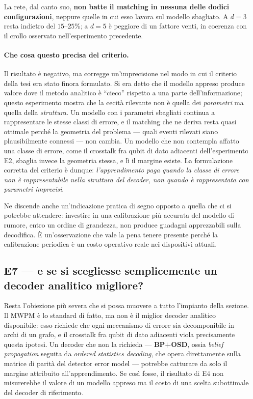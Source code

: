 La rete, dal canto suo, \textbf{non batte il matching in nessuna delle dodici configurazioni}, neppure quelle in cui esso lavora sul modello sbagliato. A $d=3$ resta indietro del $15$--$25\%$; a $d=5$ è peggiore di un fattore venti, in coerenza con il crollo osservato nell'esperimento precedente.

\paragraph{Che cosa questo precisa del criterio.}
Il risultato è negativo, ma corregge un'imprecisione nel modo in cui il criterio della tesi era stato finora formulato. Si era detto che il modello appreso produce valore dove il metodo analitico è ``cieco'' rispetto a una parte dell'informazione; questo esperimento mostra che la cecità rilevante non è quella dei \emph{parametri} ma quella della \emph{struttura}. Un modello con i parametri sbagliati continua a rappresentare le stesse classi di errore, e il matching che ne deriva resta quasi ottimale perché la geometria del problema --- quali eventi rilevati siano plausibilmente connessi --- non cambia. Un modello che non contempla affatto una classe di errore, come il crosstalk fra qubit di dato adiacenti dell'esperimento E2, sbaglia invece la geometria stessa, e lì il margine esiste. La formulazione corretta del criterio è dunque: \emph{l'apprendimento paga quando la classe di errore non è rappresentabile nella struttura del decoder, non quando è rappresentata con parametri imprecisi}.

Ne discende anche un'indicazione pratica di segno opposto a quella che ci si potrebbe attendere: investire in una calibrazione più accurata del modello di rumore, entro un ordine di grandezza, non produce guadagni apprezzabili sulla decodifica. È un'osservazione che vale la pena tenere presente perché la calibrazione periodica è un costo operativo reale nei dispositivi attuali.

\subsection[E7 --- confronto con un decoder analitico migliore]{E7 --- e se si scegliesse semplicemente un decoder analitico migliore?}
\label{subsec:neural_bposd}

Resta l'obiezione più severa che si possa muovere a tutto l'impianto della sezione. Il \ac{MWPM} è lo standard di fatto, ma non è il miglior decoder analitico disponibile: esso richiede che ogni meccanismo di errore sia decomponibile in archi di un grafo, e il crosstalk fra qubit di dato adiacenti viola precisamente questa ipotesi. Un decoder che non la richieda --- \textbf{BP+OSD}, ossia \textit{belief propagation} seguita da \textit{ordered statistics decoding}, che opera direttamente sulla matrice di parità del detector error model \cite{panteleev2021, roffe2020} --- potrebbe catturare da solo il margine attribuito all'apprendimento. Se così fosse, il risultato di E4 non misurerebbe il valore di un modello appreso ma il costo di una scelta subottimale del decoder di riferimento.

